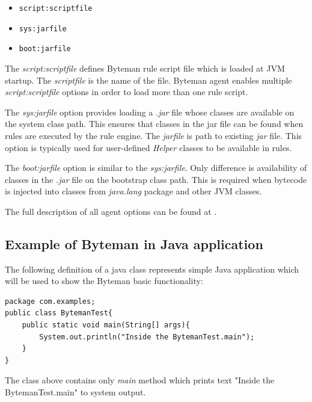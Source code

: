 \documentclass[12pt,oneside]{fithesis2}
\begin{document}
\begin{itemize}
	\item	\verb|script:scriptfile|
	\item	\verb|sys:jarfile|
	\item	\verb|boot:jarfile|
\end{itemize}

The \textit{script:scriptfile} defines Byteman rule script file which is loaded at JVM startup. The \textit{scriptfile} is the name of the file. Byteman agent enables multiple \textit{script:scriptfile} options in order to load more than one rule script.

The \textit{sys:jarfile} option provides loading a \textit{.jar} file whose classes are available on the system class path. This ensures that classes in the jar file can be found when rules are executed by the rule engine. The \textit{jarfile} is path to existing \textit{jar} file. This option is typically used for user-defined \textit{Helper} classes to be available in rules.

The \textit{boot:jarfile} option is similar to the \textit{sys:jarfile}. Only difference is availability of classes in the \textit{.jar} file on the bootstrap class path. This is required when bytecode is injected into classes from \textit{java.lang} package and other JVM classes.

The full description of all agent options can be found at \cite[Available -javaagent Options]{byteman_doc}.

\subsection{Example of Byteman in Java application}
The following definition of a java class represents simple Java application which will be used to show the Byteman basic functionality:
\begin{lstlisting}[caption = Java class bypassed by the Byteman, label = class_use_case, style=eclipse_java]
package com.examples;
public class BytemanTest{
	public static void main(String[] args){
		System.out.println("Inside the BytemanTest.main");
	}
}
\end{lstlisting}
The class above contains only \textit{main} method which prints text "Inside the BytemanTest.main" to system output.
\end{document}
